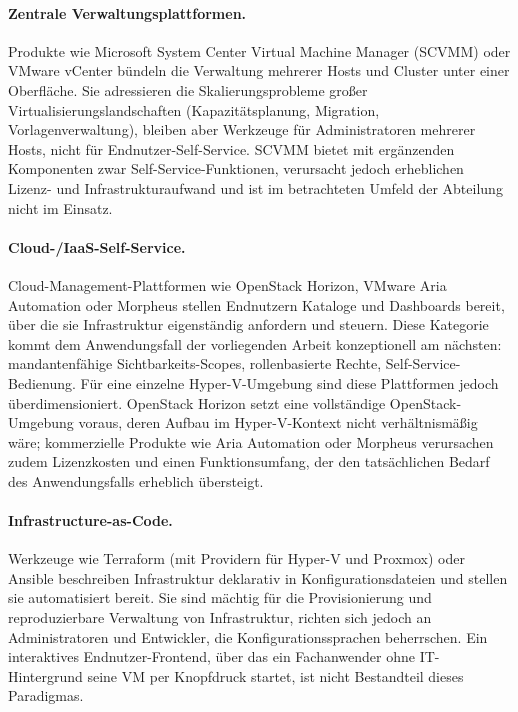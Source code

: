 \documentclass[12pt,a4paper]{article}
\begin{document}
\paragraph{Zentrale Verwaltungsplattformen.} Produkte wie Microsoft System Center Virtual Machine Manager (SCVMM) oder VMware vCenter bündeln die Verwaltung mehrerer Hosts und Cluster unter einer Oberfläche. Sie adressieren die Skalierungsprobleme großer Virtualisierungslandschaften (Kapazitätsplanung, Migration, Vorlagenverwaltung), bleiben aber Werkzeuge für Administratoren mehrerer Hosts, nicht für Endnutzer-Self-Service. SCVMM bietet mit ergänzenden Komponenten zwar Self-Service-Funktionen, verursacht jedoch erheblichen Lizenz- und Infrastrukturaufwand und ist im betrachteten Umfeld der Abteilung nicht im Einsatz.

\paragraph{Cloud-/IaaS-Self-Service.} Cloud-Management-Plattformen wie OpenStack Horizon, VMware Aria Automation oder Morpheus stellen Endnutzern Kataloge und Dashboards bereit, über die sie Infrastruktur eigenständig anfordern und steuern. Diese Kategorie kommt dem Anwendungsfall der vorliegenden Arbeit konzeptionell am nächsten: mandantenfähige Sichtbarkeits-Scopes, rollenbasierte Rechte, Self-Service-Bedienung. Für eine einzelne Hyper-V-Umgebung sind diese Plattformen jedoch überdimensioniert. OpenStack Horizon setzt eine vollständige OpenStack-Umgebung voraus, deren Aufbau im Hyper-V-Kontext nicht verhältnismäßig wäre; kommerzielle Produkte wie Aria Automation oder Morpheus verursachen zudem Lizenzkosten und einen Funktionsumfang, der den tatsächlichen Bedarf des Anwendungsfalls erheblich übersteigt.

\paragraph{Infrastructure-as-Code.} Werkzeuge wie Terraform (mit Providern für Hyper-V und Proxmox) oder Ansible beschreiben Infrastruktur deklarativ in Konfigurationsdateien und stellen sie automatisiert bereit. Sie sind mächtig für die Provisionierung und reproduzierbare Verwaltung von Infrastruktur, richten sich jedoch an Administratoren und Entwickler, die Konfigurationssprachen beherrschen. Ein interaktives Endnutzer-Frontend, über das ein Fachanwender ohne IT-Hintergrund seine VM per Knopfdruck startet, ist nicht Bestandteil dieses Paradigmas.
\end{document}
